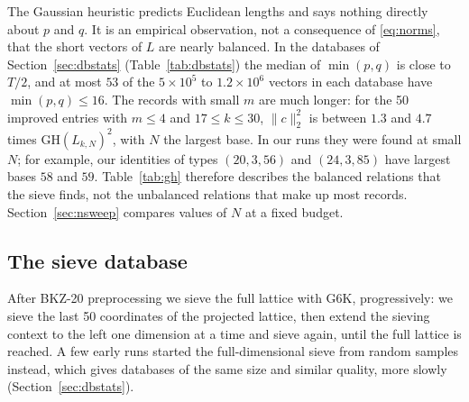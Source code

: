 \documentclass[11pt]{amsart}
\theoremstyle{definition}
\theoremstyle{remark}
\newcommand{\GH}{\mathrm{GH}}
\begin{document}
The Gaussian heuristic predicts Euclidean lengths and says nothing directly about $p$ and $q$.
It is an empirical observation, not a consequence of \eqref{eq:norms}, that the short vectors
of $L$ are nearly balanced. In the databases of Section~\ref{sec:dbstats}
(Table~\ref{tab:dbstats}) the median of $\min(p,q)$ is close to $T/2$, and at most $53$ of the
$5\times10^5$ to $1.2\times10^6$ vectors in each database have $\min(p,q)\le16$. The records
with small $m$ are much longer: for the 50 improved entries with $m\le4$ and $17\le k\le30$,
$\|c\|_2^2$ is between $1.3$ and $4.7$ times $\GH(L_{k,N})^2$, with $N$ the largest base. In
our runs they were found at small $N$; for example, our identities of types $(20,3,56)$ and
$(24,3,85)$ have largest bases $58$ and $59$. Table~\ref{tab:gh} therefore describes the
balanced relations that the sieve finds, not the unbalanced relations that make up most
records.
Section~\ref{sec:nsweep} compares values of $N$ at a fixed budget.

\begin{table}[htbp]
\centering\small

\caption{The heuristic $\GH(L_{k,N})^2$ of \eqref{eq:gh} and the value of $N$ that minimizes
it. By \eqref{eq:norms} it bounds the number of terms of a relation of length near the
shortest vector.}\label{tab:gh}
\end{table}

\subsection{The sieve database}\label{sec:sieve}
After BKZ-20 preprocessing we sieve the full lattice with G6K, progressively: we sieve the last
50 coordinates of the projected lattice, then extend the sieving context to the left one
dimension at a time and sieve again, until the full lattice is reached. A few early runs
started the full-dimensional sieve from random samples instead, which gives databases of the
same size and similar quality, more slowly (Section~\ref{sec:dbstats}).
\end{document}

